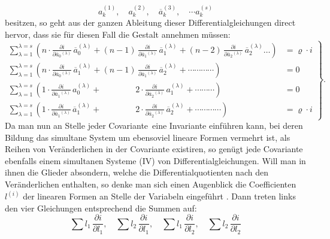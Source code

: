 \documentclass[11pt]{article}
\providecommand{\weberpage}[1]{}
\providecommand{\weq}[2]{\begin{equation}\tag{#1}#2\end{equation}}
\begin{document}
\weberpage{124}
\[
a_k^{(1)},\quad a_k^{(2)},\quad \overline{a}_k^{(3)},\quad \cdots a_k^{(s)}
\]
besitzen, so geht aus der ganzen Ableitung dieser Differentialgleichungen
 direct hervor, dass sie für diesen Fall die Gestalt annehmen
 müssen:
\weq{IV}{
\left.\begin{aligned}
\sum_{\lambda=1}^{\lambda=s}\left(n\cdot\frac{\partial i}{\partial \overline{a}_0{}^{(\lambda)}}\,\overline{a}_0^{(\lambda)} + (n-1)\,\frac{\partial i}{\partial \overline{a}_1{}^{(\lambda)}}\,\overline{a}_1^{(\lambda)} + (n-2)\,\frac{\partial i}{\partial \overline{a}_2{}^{(\lambda)}}\,\overline{a}_2^{(\lambda)}\ldots\right) &= \varrho\cdot i\\
\sum_{\lambda=1}^{\lambda=s}\left(n\cdot\frac{\partial i}{\partial \overline{a}_0{}^{(\lambda)}}\,\overline{a}_1^{(\lambda)} + (n-1)\,\frac{\partial i}{\partial \overline{a}_1{}^{(\lambda)}}\,\overline{a}_2^{(\lambda)} + \cdots\cdots\cdots\cdots\right) &= 0\\
\sum_{\lambda=1}^{\lambda=s}\left(1\cdot\frac{\partial i}{\partial \overline{a}_1{}^{(\lambda)}}\,a_0^{(\lambda)} + \phantom{(n-1)}2\cdot\frac{\partial i}{\partial \overline{a}_2{}^{(\lambda)}}\,a_1^{(\lambda)} + \cdots\cdots\cdots\right) &= 0\\
\sum_{\lambda=1}^{\lambda=s}\left(1\cdot\frac{\partial i}{\partial \overline{a}_1{}^{(\lambda)}}\,\overline{a}_1^{(\lambda)} + \phantom{(n-1)}2\cdot\frac{\partial i}{\partial \overline{a}_2{}^{(\lambda)}}\,\overline{a}_2^{(\lambda)} + \cdots\cdots\cdots\cdots\right) &= \varrho\cdot i
\end{aligned}\right\}.
}
Da man nun an Stelle jeder Covariante\footnotemark\ eine Invariante einführen
kann, bei deren Bildung das simultane System um ebensoviel lineare
Formen vermehrt ist, als Reihen von Veränderlichen in der Covariante
existiren, so genügt jede Covariante ebenfalls einem simultanen
Systeme (IV) von Differentialgleichungen. Will man in ihnen die
Glieder absondern, welche die Differentialquotienten nach den Veränderlichen
 enthalten, so denke man sich einen Augenblick die
Coefficienten $l^{(i)}$ der linearen Formen an Stelle der Variabeln eingeführt
. Dann treten links den vier Gleichungen entsprechend die
Summen auf:
\[
\sum l_1\,\frac{\partial i}{\partial l_1},\quad \sum l_2\,\frac{\partial i}{\partial l_1},\quad \sum l_1\,\frac{\partial i}{\partial l_2},\quad \sum l_2\,\frac{\partial i}{\partial l_2}
\]
\end{document}
